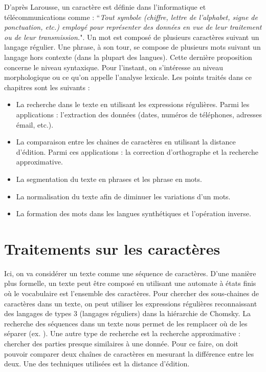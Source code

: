 \documentclass{KodeBook}
\begin{document}
D'après Larousse, un caractère est définie dans l'informatique et télécommunications comme : ``\textit{Tout symbole (chiffre, lettre de l'alphabet, signe de ponctuation, etc.) employé pour représenter des données en vue de leur traitement ou de leur transmission.}".
Un mot est composé de plusieurs caractères suivant un langage régulier. 
Une phrase, à son tour, se compose de plusieurs mots suivant un langage hors contexte (dans la plupart des langues). 
Cette dernière proposition concerne le niveau syntaxique.
Pour l'instant, on s'intéresse au niveau morphologique ou ce qu'on appelle l'analyse lexicale.
Les points traités dans ce chapitres sont les suivants : 
\begin{itemize}
	\item La recherche dans le texte en utilisant les expressions régulières. 
	Parmi les applications : l'extraction des données (dates, numéros de téléphones, adresses émail, etc.).
	
	\item La comparaison entre les chaines de caractères en utilisant la distance d'édition. 
	Parmi ces applications : la correction d'orthographe et la recherche approximative.
	
	\item La segmentation du texte en phrases et les phrase en mots. 
	
	\item La normalisation du texte afin de diminuer les variations d'un mots.
	
	\item La formation des mots dans les langues synthétiques et l'opération inverse.
\end{itemize}

\section{Traitements sur les caractères}

Ici, on va considérer un texte comme une séquence de caractères. 
D'une manière plus formelle, un texte peut être composé en utilisant une automate à états finis où le vocabulaire est l'ensemble des caractères. 
Pour chercher des sous-chaines de caractères dans un texte, on peut utiliser les expressions régulières reconnaissant des langages de types 3 (langages réguliers) dans la hiérarchie de Chomsky. 
La recherche des séquences dans un texte nous permet de les remplacer où de les séparer (ex. ).
Une autre type de recherche est la recherche approximative : chercher des parties presque similaires à une donnée. 
Pour ce faire, on doit pouvoir comparer deux chaînes de caractères en mesurant la différence entre les deux. 
Une des techniques utilisées est la distance d'édition.
\end{document}
